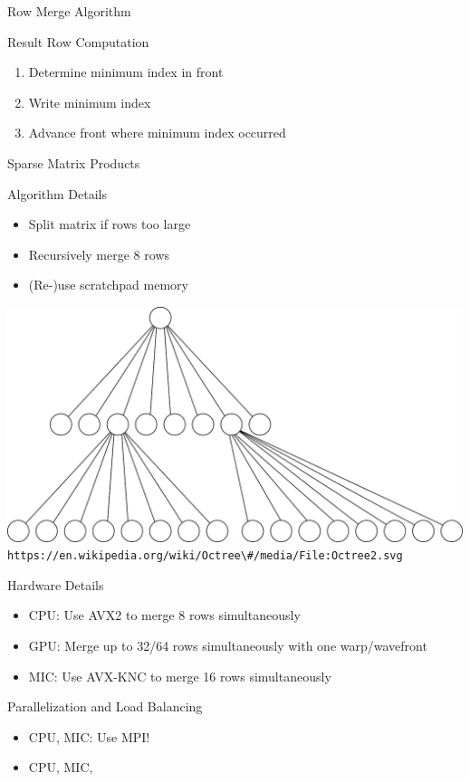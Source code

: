 



\begin{frame}{Row Merge Algorithm}

\begin{center}
\end{center}


\begin{block}{Result Row Computation}
 \begin{enumerate}
  \item Determine minimum index in front
  \pause
  \item Write minimum index
  \pause
  \item Advance front where minimum index occurred
 \end{enumerate}

\end{block}


\end{frame}



\begin{frame}[fragile]{Sparse Matrix Products}

 \begin{minipage}{0.44\textwidth}
 \begin{block}{Algorithm Details}
  \begin{itemize}
   \item Split matrix if rows too large
   \item Recursively merge 8 rows
   \item (Re-)use scratchpad memory
  \end{itemize}
 \end{block}
 \end{minipage}
 \begin{minipage}{0.55\textwidth}
  \includegraphics[width=0.999\textwidth]{figures/Octree2} \\
  {\tiny \verb|https://en.wikipedia.org/wiki/Octree\#/media/File:Octree2.svg|}
 \end{minipage}

 \pause
 \begin{block}{Hardware Details}
  \begin{itemize}
   \item CPU: Use AVX2 to merge 8 rows simultaneously
   \item GPU: Merge up to 32/64 rows simultaneously with one warp/wavefront
   \item MIC: Use AVX-KNC to merge 16 rows simultaneously
  \end{itemize}
 \end{block}

 \pause
  \begin{block}{Parallelization and Load Balancing}
  \begin{itemize}
   \item CPU, MIC: Use MPI!
   \item CPU, MIC, 
\end{itemize}
\end{block}
\end{frame}

